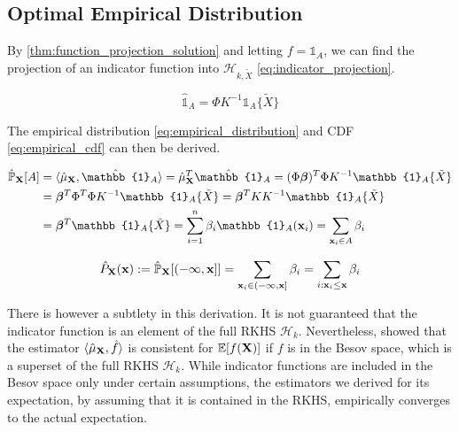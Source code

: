 \documentclass[twoside]{article} \usepackage{aistats2017}
\theoremstyle{definition}
\newtheorem{theorem}{Theorem}[section]
\newcommand{\rv}[1]{{#1}}
\newcommand{\ds}[1]{\tilde{#1}}
\begin{document}
	\subsection{Optimal Empirical Distribution}
	\label{sec:discriminative_quantile_regression:optimal_empirical_distribution}
	
			By \cref{thm:function_projection_solution} and letting $f = \mathbb{1}_{A}$, we can find the projection of an indicator function into $\mathcal{H}_{k, \ds{X}}$ \eqref{eq:indicator_projection}.
			
			\begin{equation}
				\hat{\mathbb{1}}_{A} = \Phi K^{-1} \mathbb{1}_{A}\{\ds{X}\}
			\label{eq:indicator_projection}
			\end{equation}
			
			The empirical distribution \eqref{eq:empirical_distribution} and CDF \eqref{eq:empirical_cdf} can then be derived.
	
			\begin{equation}
			\begin{aligned}
				\hat{\mathbb{P}}_{\bvec{\rv{X}}}[A] &= \langle \hat{\mu}_{\bvec{\rv{X}}}, \hat{\mathbb{1}}_{A} \rangle = \hat{\mu}_{\bvec{\rv{X}}}^{T}\hat{\mathbb{1}}_{A} = (\Phi \bm{\beta})^{T} \Phi K^{-1} \mathbb{1}_{A}\{\ds{X}\} \\
				&= \bm{\beta}^{T} \Phi^{T} \Phi K^{-1} \mathbb{1}_{A}\{\ds{X}\} = \bm{\beta}^{T} K K^{-1} \mathbb{1}_{A}\{\ds{X}\} \\
				&= \bm{\beta}^{T} \mathbb{1}_{A}\{\ds{X}\} = \sum_{i = 1}^{n} \beta_{i} \mathbb{1}_{A}(\bvec{x}_{i}) = \sum_{\bvec{x}_{i} \in A} \beta_{i}
			\end{aligned}
			\label{eq:empirical_distribution}
			\end{equation}
	
			\begin{equation}
				\hat{P}_{\bvec{\rv{X}}}(\bvec{x}) := \hat{\mathbb{P}}_{\bvec{\rv{X}}}[(-\bvec{\infty}, \bvec{x}]] = \sum_{\bvec{x}_{i} \in (-\bvec{\infty}, \bvec{x}]} \beta_{i} = \sum_{i : \bvec{x}_{i} \leq \bvec{x}} \beta_{i}
			\label{eq:empirical_cdf}
			\end{equation}

		There is however a subtlety in this derivation. It is not guaranteed that the indicator function is an element of the full RKHS $\mathcal{H}_{k}$. Nevertheless, \cite{Kanagawa:RecoveringDistributions} showed that the estimator $\langle \hat{\mu}_{\bvec{\rv{X}}}, \hat{f} \rangle$ is consistent for $\mathbb{E}[f(\bvec{\rv{X}})]$ if $f$ is in the Besov space, which is a superset of the full RKHS $\mathcal{H}_{k}$. While indicator functions are included in the Besov space only under certain assumptions, the estimators we derived for its expectation, by assuming that it is contained in the RKHS, empirically converges to the actual expectation.
\end{document}
